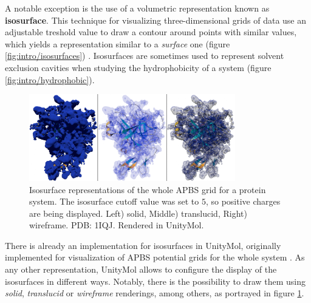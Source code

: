     A notable exception is the use of a volumetric representation known as \textbf{isosurface}. This technique for visualizing three-dimensional grids of data use an adjustable treshold value to draw a contour around points with similar values, which yields a representation similar to a \textit{surface} one (figure \ref{fig:intro/isosurfaces}) \cite{isosurfaces_web}. Isosurfaces are sometimes used to represent solvent exclusion cavities when studying the hydrophobicity of a system (figure \ref{fig:intro/hydrophobic}).

    \begin{figure}[H]
      \centering
      \includegraphics[width=0.8\textwidth]{figures/intro/isosurfaces_umol.png}
      \caption{\label{fig:intro/isosurfaces_umol} Isosurface representations of the whole APBS grid for a protein system. The isosurface cutoff value was set to $5$, so positive charges are being displayed. Left) solid, Middle) translucid, Right) wireframe. PDB: 1IQJ. Rendered in UnityMol.}
    \end{figure}

    There is already an implementation for isosurfaces in UnityMol, originally implemented for visualization of APBS potential grids for the whole system \cite{umol_apbs_2020}. As any other representation, UnityMol allows to configure the display of the isosurfaces in different ways. Notably, there is the possibility to draw them using \textit{solid}, \textit{translucid} or \textit{wireframe} renderings, among others, as portrayed in figure \ref{fig:intro/isosurfaces_umol}.




